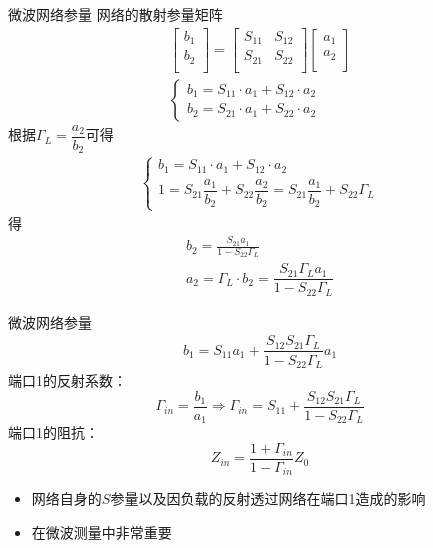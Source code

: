 \begin{frame}{微波网络参量}
    网络的散射参量矩阵
    \begin{gather*}
        \begin{bmatrix*}
            b_1 \\
            b_2 \\
        \end{bmatrix*}
        =
        \begin{bmatrix*}
            S_{11} & S_{12} \\
            S_{21} & S_{22} \\
        \end{bmatrix*}
        \begin{bmatrix*}
            a_1 \\
            a_2 \\
        \end{bmatrix*}\\
        \begin{cases}
            b_1=S_{11}\cdot a_1+S_{12}\cdot a_2 \\
            b_2=S_{21}\cdot a_1+S_{22}\cdot a_2
        \end{cases}
    \end{gather*}
    根据$\Gamma_L=\dfrac{a_2}{b_2}$可得
    \begin{gather*}
        \begin{cases}
            b_1=S_{11}\cdot a_1+S_{12}\cdot a_2 \\
            1=S_{21}\dfrac{a_1}{b_2}+S_{22}\dfrac{a_2}{b_2}=S_{21}\dfrac{a_1}{b_2}+S_{22}\Gamma_L
        \end{cases}
    \end{gather*}
    得
    \begin{gather*}
        b_2=\frac{S_{21}a_1}{1-S_{22}\Gamma_L}\\
        a_2=\Gamma_L \cdot b_2=\dfrac{S_{21}\Gamma_L a_1}{1-S_{22}\Gamma_L}
    \end{gather*}
\end{frame}

\begin{frame}{微波网络参量}
    \begin{align*}
        b_1=S_{11}a_1+\dfrac{S_{12}S_{21}\Gamma_L}{1-S_{22}\Gamma_L}a_1
    \end{align*}
    端口1的反射系数：
    $$\Gamma_{in}=\frac{b_1}{a_1}\Rightarrow \Gamma_{in}=S_{11}+\frac{S_{12}S_{21}\Gamma_L}{1-S_{22}\Gamma_L}$$
    端口1的阻抗：
    $$Z_{in}=\frac{1+\Gamma_{in}}{1-\Gamma_{in}}Z_0$$
    \begin{itemize}
        \item 网络自身的$S$参量以及因负载的反射透过网络在端口1造成的影响
        \item 在微波测量中非常重要
    \end{itemize}
\end{frame}

